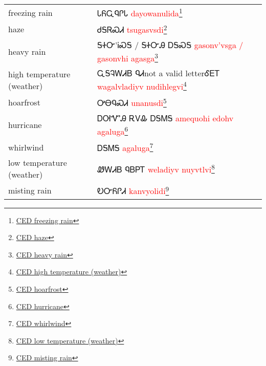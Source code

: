 \begin{minipage}{\linewidth}
\begin{tabular}{p{3cm} p{11cm}}
freezing rain & ᏓᏲᏩᏄᎵᏓ 
 \newline \textcolor{red}{dayowanulida}\footnote{\href{https://cherokeedictionary.net/share/101963}{CED freezing rain}}\\
haze & ᏧᎦᏒᏍᏗ 
 \newline \textcolor{red}{tsugasvsdi}\footnote{\href{https://cherokeedictionary.net/share/101964}{CED haze}}\\
heavy rain & ᎦᏐᏅ'ᎥᏍᎦ / ᎦᏐᏅᎯ  ᎠᎦᏍᎦ 
 \newline \textcolor{red}{gasonv'vsga / gasonvhi  agasga}\footnote{\href{https://cherokeedictionary.net/share/101965}{CED heavy rain}}\\
high temperature (weather) & ᏩᎦᎸᎳᏗᏴ ᏄᏗnot a valid letterᎴᎬᎢ 
 \newline \textcolor{red}{wagalvladiyv nudihlegvi}\footnote{\href{https://cherokeedictionary.net/share/101966}{CED high temperature (weather)}}\\
hoarfrost & ᎤᎾᏄᏍᏗ 
 \newline \textcolor{red}{unanusdi}\footnote{\href{https://cherokeedictionary.net/share/101967}{CED hoarfrost}}\\
hurricane & ᎠᎺᏉᎯ  ᎡᏙᎲ ᎠᎦᎷᎦ 
 \newline \textcolor{red}{amequohi  edohv agaluga}\footnote{\href{https://cherokeedictionary.net/share/101968}{CED hurricane}}\\
whirlwind & ᎠᎦᎷᎦ 
 \newline \textcolor{red}{agaluga}\footnote{\href{https://cherokeedictionary.net/share/101969}{CED whirlwind}}\\
low temperature (weather) & ᏪᎳᏗᏴ ᏄᏴᏢᎢ 
 \newline \textcolor{red}{weladiyv nuyvtlvi}\footnote{\href{https://cherokeedictionary.net/share/101970}{CED low temperature (weather)}}\\
misting rain & ᎧᏅᏲᎵᏗ 
 \newline \textcolor{red}{kanvyolidi}\footnote{\href{https://cherokeedictionary.net/share/101971}{CED misting rain}}\\
\end{tabular}
\end{minipage}

